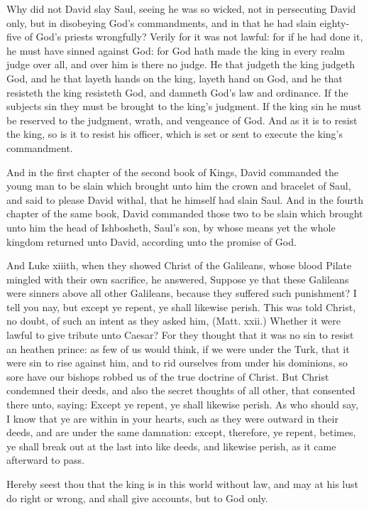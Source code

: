 Why did not David slay Saul, seeing he was so wicked,
not in persecuting David only, but in disobeying God's
commandments, and in that he had slain eighty-five of 
God's priests wrongfully? Verily for it was not lawful:
for if he had done it, he must have sinned against God:
for God hath made the king in every realm judge over 
all, and over him is there no judge. He that judgeth the 
king judgeth God, and he that layeth hands on the king, 
layeth hand on God, and he that resisteth the king resisteth
God, and damneth God's law and ordinance. If the 
subjects sin they must be brought to the king's judgment. 
If the king sin he must be reserved to the judgment, 
wrath, and vengeance of God. And as it is to resist the 
king, so is it to resist his officer, which is set or sent to 
execute the king's commandment. 

And in the first chapter of the second book of Kings, 
David commanded the young man to be slain which 
brought unto him the crown and bracelet of Saul, and said 
to please David withal, that he himself had slain Saul.
And in the fourth chapter of the same book, David commanded
those two to be slain which brought unto him the 
head of Ishbosheth, Saul's son, by whose means yet the
whole kingdom returned unto David, according unto the 
promise of God.

And Luke xiiith, when they showed Christ of the
Galileans, whose blood Pilate mingled with their own 
sacrifice, he answered, Suppose ye that these Galileans 
were sinners above all other Galileans, because they suffered
such punishment? I tell you nay, but except ye 
repent, ye shall likewise perish. This was told Christ, 
no doubt, of such an intent as they asked him, (Matt.
xxii.) Whether it were lawful to give tribute unto Caesar?
For they thought that it was no sin to resist an heathen 
prince: as few of us would think, if we were under the 
Turk, that it were sin to rise against him, and to rid ourselves
from under his dominions, so sore have our bishops 
robbed us of the true doctrine of Christ. But Christ 
condemned their deeds, and also the secret thoughts of 
all other, that consented there unto, saying: Except ye 
repent, ye shall likewise perish. As who should say, I 
know that ye are within in your hearts, such as they were 
outward in their deeds, and are under the same damnation:
except, therefore, ye repent, betimes, ye shall break out 
at the last into like deeds, and likewise perish, as it came 
afterward to pass. 

Hereby seest thou that the king is in this world without 
law, and may at his lust do right or wrong, and shall give 
accounts, but to God only. 

